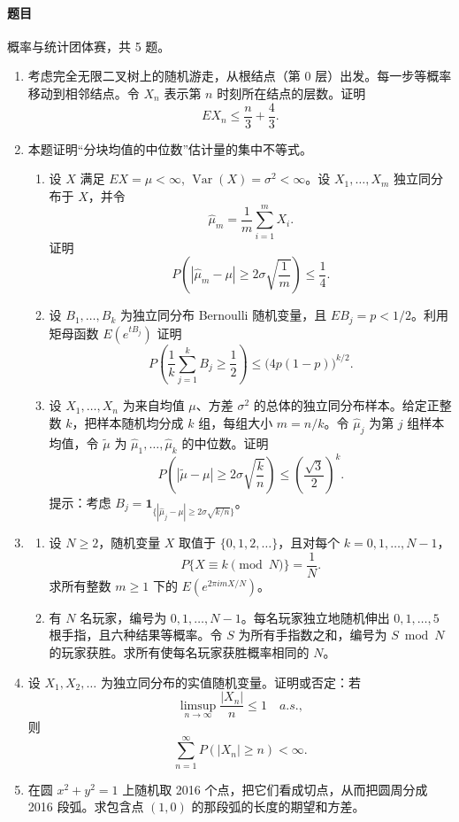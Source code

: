 \documentclass[UTF8,12pt]{ctexart}
\begin{document}
\paragraph{题目}
概率与统计团体赛，共 5 题。
\begin{enumerate}[label=\textbf{\arabic*.},leftmargin=2.2em]
\item 考虑完全无限二叉树上的随机游走，从根结点（第 \(0\) 层）出发。每一步等概率移动到相邻结点。令 \(X_n\) 表示第 \(n\) 时刻所在结点的层数。证明
\[
E X_n\le \frac n3+\frac43.
\]

\item 本题证明“分块均值的中位数”估计量的集中不等式。
\begin{enumerate}[label=\textbf{(\arabic*)},leftmargin=2.4em]
\item 设 \(X\) 满足 \(E X=\mu<\infty\), \(\operatorname{Var}(X)=\sigma^2<\infty\)。设 \(X_1,\ldots,X_m\) 独立同分布于 \(X\)，并令
\[
\widehat\mu_m=\frac1m\sum_{i=1}^m X_i.
\]
证明
\[
P\left(|\widehat\mu_m-\mu|\ge 2\sigma\sqrt{\frac1m}\right)\le \frac14.
\]
\item 设 \(B_1,\ldots,B_k\) 为独立同分布 Bernoulli 随机变量，且 \(E B_j=p<1/2\)。利用矩母函数 \(E(e^{tB_j})\) 证明
\[
P\left(\frac1k\sum_{j=1}^k B_j\ge \frac12\right)\le \bigl(4p(1-p)\bigr)^{k/2}.
\]
\item 设 \(X_1,\ldots,X_n\) 为来自均值 \(\mu\)、方差 \(\sigma^2\) 的总体的独立同分布样本。给定正整数 \(k\)，把样本随机均分成 \(k\) 组，每组大小 \(m=n/k\)。令 \(\widehat\mu_j\) 为第 \(j\) 组样本均值，令 \(\widetilde\mu\) 为 \(\widehat\mu_1,\ldots,\widehat\mu_k\) 的中位数。证明
\[
P\left(|\widetilde\mu-\mu|\ge 2\sigma\sqrt{\frac{k}{n}}\right)\le \left(\frac{\sqrt3}{2}\right)^k.
\]
提示：考虑 \(B_j=\mathbf 1_{\{|\widehat\mu_j-\mu|\ge 2\sigma\sqrt{k/n}\}}\)。
\end{enumerate}

\item
\begin{enumerate}[label=\textbf{(\alph*)},leftmargin=2.4em]
\item 设 \(N\ge2\)，随机变量 \(X\) 取值于 \(\{0,1,2,\ldots\}\)，且对每个 \(k=0,1,\ldots,N-1\)，
\[
P\{X\equiv k\pmod N\}=\frac1N.
\]
求所有整数 \(m\ge1\) 下的 \(E(e^{2\pi i mX/N})\)。
\item 有 \(N\) 名玩家，编号为 \(0,1,\ldots,N-1\)。每名玩家独立地随机伸出 \(0,1,\ldots,5\) 根手指，且六种结果等概率。令 \(S\) 为所有手指数之和，编号为 \(S\bmod N\) 的玩家获胜。求所有使每名玩家获胜概率相同的 \(N\)。
\end{enumerate}

\item 设 \(X_1,X_2,\ldots\) 为独立同分布的实值随机变量。证明或否定：若
\[
\limsup_{n\to\infty}\frac{|X_n|}{n}\le 1\quad a.s.,
\]
则
\[
\sum_{n=1}^\infty P(|X_n|\ge n)<\infty.
\]

\item 在圆 \(x^2+y^2=1\) 上随机取 2016 个点，把它们看成切点，从而把圆周分成 2016 段弧。求包含点 \((1,0)\) 的那段弧的长度的期望和方差。
\end{enumerate}
\end{document}
